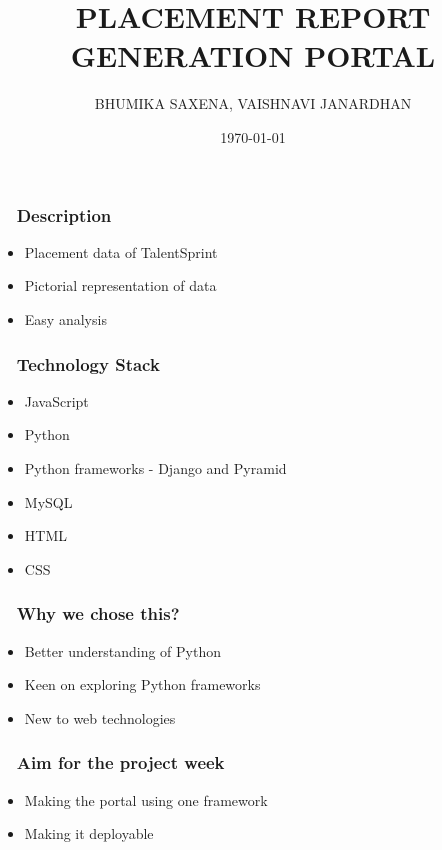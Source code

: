 \documentclass{beamer}
\title[Placement Report Generation Portal]{PLACEMENT REPORT GENERATION PORTAL } %
\author[Bhumika, Vaishnavi]{BHUMIKA SAXENA, VAISHNAVI JANARDHAN} %
{
\medskip
}
\date{\today} %
\begin{document}
\begin{frame}
\titlepage %
\end{frame}

\begin{frame}
\frametitle{~ Description}
\begin {itemize}
\item{Placement data of TalentSprint}
\bigskip
\bigskip
\item{Pictorial representation of data}
\bigskip
\bigskip
\item{Easy analysis}
\end{itemize}
\end{frame}

\begin{frame}
\frametitle{ ~ Technology Stack} 
\begin{itemize}
\item{JavaScript}
\item{Python} 
\item{Python frameworks - Django and Pyramid}
\item{MySQL}
\item{HTML} 
\item{CSS}
\end{itemize}
\end{frame}

\begin{frame}
\frametitle{ ~ Why we chose this?} 
\begin{itemize}
\item{Better understanding of Python}
\item{Keen on exploring Python frameworks}
\item{New to web technologies} 
\end{itemize}
\end{frame}

\begin{frame}
\frametitle{ ~ Aim for the project week} 
\begin{itemize}
\item{Making the portal using one framework}
\item{Making it deployable}
\end{itemize}
\end{frame}
\end{document}

